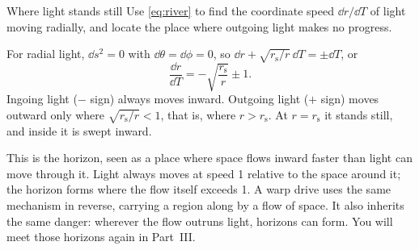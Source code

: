 \begin{example}{Where light stands still}\label{ex:horizon}
Use \cref{eq:river} to find the coordinate speed $\dd r/\dd T$ of light moving
radially, and locate the place where outgoing light makes no progress.

\solution For radial light, $\dd s^{2} = 0$ with $\dd\theta = \dd\phi = 0$, so
$\dd r + \sqrt{r_{\mathrm{s}}/r}\,\dd T = \pm\dd T$, or
\begin{equation*}
  \frac{\dd r}{\dd T} = -\sqrt{\frac{r_{\mathrm{s}}}{r}} \pm 1 .
\end{equation*}
Ingoing light ($-$ sign) always moves inward. Outgoing light ($+$ sign) moves
outward only where $\sqrt{r_{\mathrm{s}}/r} < 1$, that is, where $r > r_{\mathrm{s}}$.
At $r = r_{\mathrm{s}}$ it stands still, and inside it is swept inward.

\discussion This is the horizon, seen as a place where space flows inward faster
than light can move through it. Light always moves at speed 1 relative to the
space around it; the horizon forms where the flow itself exceeds 1. A warp drive
uses the same mechanism in reverse, carrying a region along by a flow of space.
It also inherits the same danger: wherever the flow outruns light, horizons can
form. You will meet those horizons again in Part~III.
\end{example}

